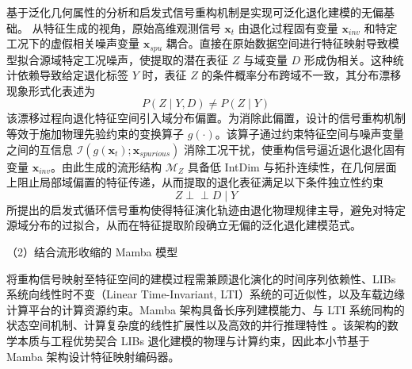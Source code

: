 基于泛化几何属性的分析和启发式信号重构机制是实现可泛化退化建模的无偏基础。
% 
从特征生成的视角，原始高维观测信号 $\boldsymbol{x}_{t}$ 由退化过程固有变量 $\boldsymbol{x}_{inv}$ 和特定工况下的虚假相关噪声变量 $\boldsymbol{x}_{spu}$ 耦合。直接在原始数据空间进行特征映射导致模型拟合源域特定工况噪声，使提取的潜在表征 $Z$ 与域变量 $D$ 形成伪相关。这种统计依赖导致给定退化标签 $Y$ 时，表征 $Z$ 的条件概率分布跨域不一致，其分布漂移现象形式化表述为
% 
\begin{equation}
    P(Z \mid Y, D) \neq P(Z \mid Y)
\end{equation}
% 
该漂移过程向退化特征空间引入域分布偏置。为消除此偏置，设计的信号重构机制等效于施加物理先验约束的变换算子 $g(\cdot)$。该算子通过约束特征空间与噪声变量之间的互信息 $\mathcal{I}(g(\boldsymbol{x}_{t}); \boldsymbol{x}_{spurious})$ 消除工况干扰，使重构信号逼近退化退化固有变量 $\boldsymbol{x}_{inv}$。由此生成的流形结构 $\mathcal{M}_Z$ 具备低 IntDim 与拓扑连续性，在几何层面上阻止局部域偏置的特征传递，从而提取的退化表征满足以下条件独立性约束
% 
\begin{equation}
    Z \perp \!\!\! \perp D \mid Y
\end{equation}
% 
所提出的启发式循环信号重构使得特征演化轨迹由退化物理规律主导，避免对特定源域分布的过拟合，从而在特征提取阶段确立无偏的泛化退化建模范式。

（2）结合流形收缩的 Mamba 模型

将重构信号映射至特征空间的建模过程需兼顾退化演化的时间序列依赖性、LIBs 系统向线性时不变（Linear Time-Invariant, LTI）系统的可近似性，以及车载边缘计算平台的计算资源约束。Mamba 架构具备长序列建模能力、与 LTI 系统同构的状态空间机制、计算复杂度的线性扩展性以及高效的并行推理特性 \cite{gu2024mamba}。该架构的数学本质与工程优势契合 LIBs 退化建模的物理与计算约束，因此本小节基于 Mamba 架构设计特征映射编码器。

